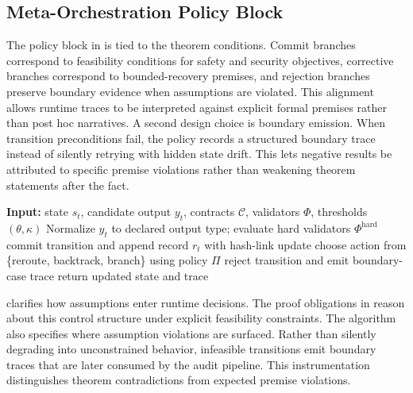 \documentclass{article} %
\begin{document}
\subsection{Meta-Orchestration Policy Block}
The policy block in  is tied to the theorem conditions. Commit branches correspond to feasibility conditions for safety and security objectives, corrective branches correspond to bounded-recovery premises, and rejection branches preserve boundary evidence when assumptions are violated. This alignment allows runtime traces to be interpreted against explicit formal premises rather than post hoc narratives.
A second design choice is boundary emission. When transition preconditions fail, the policy records a structured boundary trace instead of silently retrying with hidden state drift. This lets negative results be attributed to specific premise violations rather than weakening theorem statements after the fact.
\begin{algorithm}[t]
\caption{Contract-governed meta-orchestration policy used during long-horizon execution. The procedure shows how validator outcomes, uncertainty signals, and bounded corrective depth determine continue, reroute, backtrack, or branch actions while preserving committed-prefix consistency.}
\label{alg:meta_orchestrator}
\begin{algorithmic}[1]
\STATE \textbf{Input:} state $s_t$, candidate output $y_t$, contracts $\mathcal{C}$, validators $\Phi$, thresholds $(\theta,\kappa)$
\STATE Normalize $y_t$ to declared output type; evaluate hard validators $\Phi^{\mathrm{hard}}$
    \STATE commit transition and append record $r_t$ with hash-link update
    \STATE choose action from \{reroute, backtrack, branch\} using policy $\Pi$
\ELSE
    \STATE reject transition and emit boundary-case trace
\ENDIF
\STATE return updated state and trace
\end{algorithmic}
\end{algorithm}

 clarifies how assumptions enter runtime decisions. The proof obligations in  reason about this control structure under explicit feasibility constraints.
The algorithm also specifies where assumption violations are surfaced. Rather than silently degrading into unconstrained behavior, infeasible transitions emit boundary traces that are later consumed by the audit pipeline. This instrumentation distinguishes theorem contradictions from expected premise violations.
\end{document}
